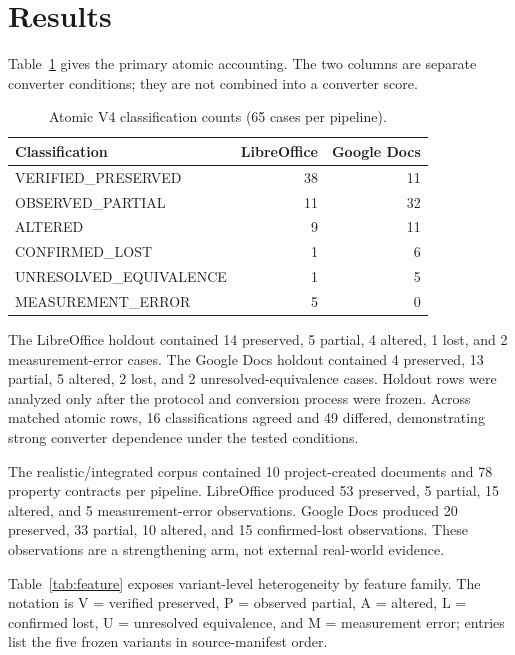 \documentclass[10pt]{article}
\begin{document}
\section{Results}
Table~\ref{tab:atomic} gives the primary atomic accounting. The two columns are separate converter conditions; they are not combined into a converter score.

\begin{table}[h]
\centering
\caption{Atomic V4 classification counts (65 cases per pipeline).}
\label{tab:atomic}
\begin{tabular}{lrr}
\toprule
Classification & LibreOffice & Google Docs\\
\midrule
VERIFIED\_PRESERVED & 38 & 11\\
OBSERVED\_PARTIAL & 11 & 32\\
ALTERED & 9 & 11\\
CONFIRMED\_LOST & 1 & 6\\
UNRESOLVED\_EQUIVALENCE & 1 & 5\\
MEASUREMENT\_ERROR & 5 & 0\\
\bottomrule
\end{tabular}
\end{table}

The LibreOffice holdout contained 14 preserved, 5 partial, 4 altered, 1 lost, and 2 measurement-error cases. The Google Docs holdout contained 4 preserved, 13 partial, 5 altered, 2 lost, and 2 unresolved-equivalence cases. Holdout rows were analyzed only after the protocol and conversion process were frozen. Across matched atomic rows, 16 classifications agreed and 49 differed, demonstrating strong converter dependence under the tested conditions.

The realistic/integrated corpus contained 10 project-created documents and 78 property contracts per pipeline. LibreOffice produced 53 preserved, 5 partial, 15 altered, and 5 measurement-error observations. Google Docs produced 20 preserved, 33 partial, 10 altered, and 15 confirmed-lost observations. These observations are a strengthening arm, not external real-world evidence.

Table~\ref{tab:feature} exposes variant-level heterogeneity by feature family. The notation is V = verified preserved, P = observed partial, A = altered, L = confirmed lost, U = unresolved equivalence, and M = measurement error; entries list the five frozen variants in source-manifest order.
\end{document}
